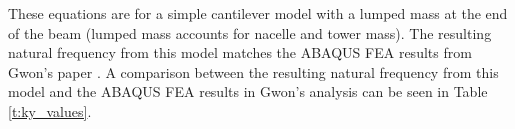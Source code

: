 These equations are for a simple cantilever model with a lumped mass at the end of the beam (lumped mass accounts for nacelle and tower mass).  The resulting natural frequency from this model matches the ABAQUS FEA results from Gwon's paper \cite{Gwon_paper}.  A comparison between the resulting natural frequency from this model and the ABAQUS FEA results in Gwon's analysis \cite{Gwon_paper} can be seen in Table \ref{t:ky_values}.